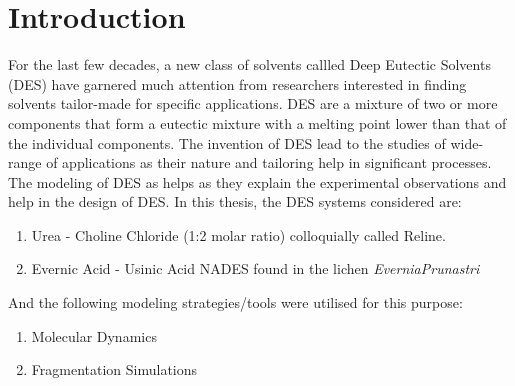 \section{Introduction}
\label{sec:intro}
For the last few decades, a new class of solvents callled Deep Eutectic Solvents (DES) have garnered much attention from researchers interested in finding solvents tailor-made for specific applications. DES are a mixture of two or more components that form a eutectic mixture with a melting point lower than that of the individual components.
The invention of DES lead to the studies of wide-range of applications as their nature and tailoring help in significant processes. The modeling of DES as helps as they explain the experimental observations and help in the design of DES. In this thesis, the DES systems considered are:
\begin{enumerate}
\item Urea - Choline Chloride (1:2 molar ratio) colloquially called Reline.
\item Evernic Acid - Usinic Acid NADES found in the lichen \textit{EverniaPrunastri}
\end{enumerate}
And the following modeling strategies/tools were utilised for this purpose:
\begin{enumerate}
\item Molecular Dynamics
\item Fragmentation Simulations

\end{enumerate}